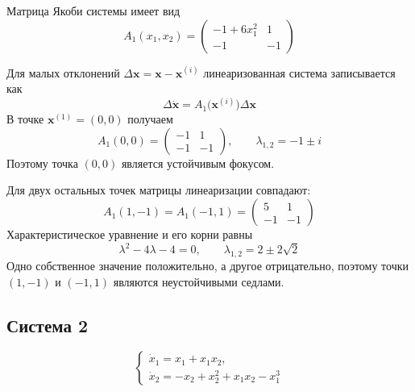 Матрица Якоби системы имеет вид
\begin{equation}
  A_1(x_1,x_2)=
  \begin{pmatrix}
    -1+6x_1^2 & 1\\
    -1 & -1
  \end{pmatrix}
\end{equation}

Для малых отклонений
$\Delta\bm x=\bm x-\bm x^{(i)}$ линеаризованная система записывается как
\begin{equation}
  \Delta\dot{\bm x}=A_1\bigl(\bm x^{(i)}\bigr)\Delta\bm x
\end{equation}
В точке $\bm x^{(1)}=(0,0)$ получаем
\begin{equation}
  A_1(0,0)=
  \begin{pmatrix}
    -1 & 1\\
    -1 & -1
  \end{pmatrix},
  \qquad
  \lambda_{1,2}=-1\pm i
\end{equation}
Поэтому точка $(0,0)$ является устойчивым фокусом.

Для двух остальных точек матрицы линеаризации совпадают:
\begin{equation}
  A_1(1,-1)=A_1(-1,1)=
  \begin{pmatrix}
    5 & 1\\
    -1 & -1
  \end{pmatrix}
\end{equation}
Характеристическое уравнение и его корни равны
\begin{equation}
  \lambda^2-4\lambda-4=0,
  \qquad
  \lambda_{1,2}=2\pm2\sqrt{2}
\end{equation}
Одно собственное значение положительно, а другое отрицательно, поэтому
точки $(1,-1)$ и $(-1,1)$ являются неустойчивыми седлами.


\subsection{Система 2}

\begin{equation}
  \begin{cases}
    \dot x_1=x_1+x_1x_2,\\
    \dot x_2=-x_2+x_2^2+x_1x_2-x_1^3
  \end{cases}
  \label{eq:system-2}
\end{equation}

